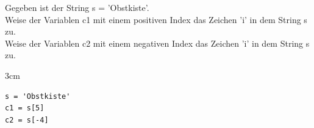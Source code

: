 \question[2]
Gegeben ist der String s = 'Obstkiste'. \\
Weise der Variablen c1 mit einem positiven Index das Zeichen 'i' in dem String s zu. \\
Weise der Variablen c2 mit einem negativen Index das Zeichen 'i' in dem String s zu. 
\begin{solutionbox}{3cm}
\begin{lstlisting}
s = 'Obstkiste'
c1 = s[5]
c2 = s[-4]
\end{lstlisting}
\end{solutionbox}